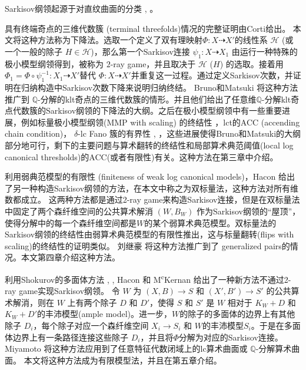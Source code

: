 Sarkisov纲领起源于对直纹曲面的分类 \cite{sarkisovBIRATIONALAUTOMORPHISMSCONIC1981}, \cite{sarkisovCONICBUNDLESTRUCTURES1983}。

具有终端奇点的三维代数簇 (terminal threefolds)情况的完整证明由Corti\cite{cortiFactoringBirationalMaps}给出。 本文将这种方法称为下降法。选取一个定义了双有理映射$\Phi:X \dashrightarrow X'$的线性系 $\mathcal{H}$ (或一个一般的除子 $H \in \mathcal{H}$)，那么第一个Sarkisov连接 $\psi_1:X\dashrightarrow X_1$ 由运行一种特殊的极小模型纲领得到，被称为 $2$-ray game，并且取决于 $\mathcal{H}$ ($H$) 的选取。接着用 $\Phi_{1}=\Phi\circ \psi_1^{-1}: X_1 \dashrightarrow X'$替代 $\Phi:X\dashrightarrow X'$并重复这一过程。通过定义Sarkisov次数，并证明在归纳构造中Sarkisov次数下降来说明归纳终结。 Bruno和Matsuki \cite{brunoLogSarkisovProgram1995} 将这种方法推广到 $\mathbb{Q}$-分解的klt奇点的三维代数簇的情形。并且他们给出了任意维$\mathbb{Q}$-分解klt奇点代数簇的Sarkisov纲领的下降法的大纲。之后在极小模型纲领中有一些重要进展，例如标量极小模型纲领(MMP with scaling) 的终结性 \cite{BCHM10}，lct的ACC (accending chain condition)\cite{HMX14}， $\delta$-lc Fano 簇的有界性 \cite{Bir19}, \cite{birkarSingularitiesLinearSystems2020}，这些进展使得Bruno和Matsuki的大纲部分地可行，剩下的主要问题与算术翻转的终结性和局部算术典范阈值(local log canonical thresholds)的ACC(或者有限性)有关。这种方法在第三章中介绍。



利用弱典范模型的有限性\cite{BCHM10} (finiteness of weak log canonical models)，Hacon \cite{haconMinimalModelProgram2012} 给出了另一种构造Sarkisov纲领的方法，在本文中称之为双标量法，这种方法对所有维数都成立。
这两种方法都是通过2-ray game来构造Sarkisov连接，但是在双标量法中固定了两个森纤维空间的公共算术解消 $(W,B_W)$ 作为Sarkisov纲领的``屋顶''，使得分解中的每一个森纤维空间都是$W$的某个弱算术典范模型。双标量法的Sarkisov纲领的终结性由弱算术典范模型的有限性推出，这与标量翻转(flips with scaling)的终结性的证明类似。
刘继豪 \cite{liuSarkisovProgramGeneralized2021} 将这种方法推广到了 generalized pairs的情况。本文第四章介绍这种方法。


利用Shokurov的多面体方法 \cite{Sho96}, \cite{cs11}, Hacon 和 M\textsuperscript{c}Kernan \cite{haconSarkisovProgram2012}给出了一种新方法不通过2-ray game实现Sarkisov纲领。
令 $W$ 为 $(X,B)\to S$ 和 $(X',B')\to S'$ 的公共算术解消，则在 $W$ 上有两个除子 $D$ 和 $D'$，使得 $S$ 和 $S'$ 是 $W$ 相对于 $K_W+D$ 和 $K_W+D'$的丰沛模型(ample model)。进一步，$W$的除子的多面体的边界上有其他除子 $D_{i}$，每个除子对应一个森纤维空间 $X_i\to S_i$ 和 $W$的丰沛模型$S_i$。于是在多面体边界上有一条路径连接这些除子 $D_{i}$，并且将$\Phi$分解为对应的Sarkisov连接。
Miyamoto \cite{miyamoto2019TheSP} 将这种方法应用到了任意特征代数闭域上的lc算术曲面或 $\mathbb{Q}$-分解算术曲面。
本文将这种方法成为有限模型法，并且在第五章介绍。

